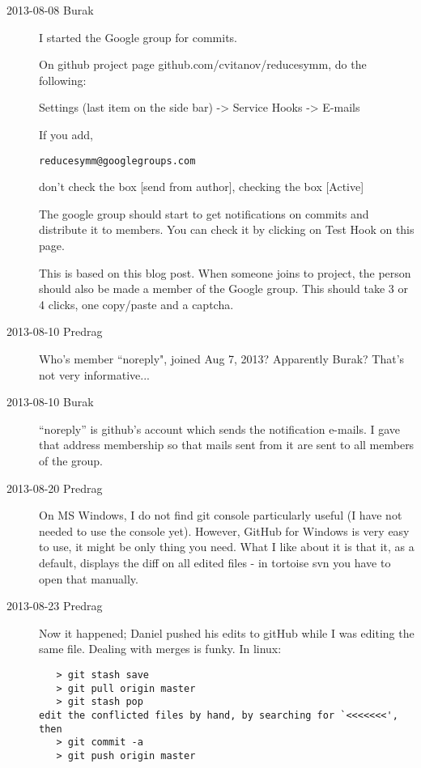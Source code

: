 \begin{description}
\item[2013-08-08 Burak]
I started the
 {Google group} for  commits.

On github project page
{github.com/cvitanov/reducesymm}, do the following:

Settings (last item on the side bar) -> Service Hooks -> E-mails

If you add,

\texttt{reducesymm@googlegroups.com}

don't check the box [send from author], checking the box [Active]

The google group should start to get notifications on commits and
distribute it to members.  You can check it by clicking on Test Hook on
this page.

This is based on
{this blog post}.
When someone joins
to project, the person should also be made a member of the
 {Google group}.
This should take 3 or 4 clicks, one copy/paste and a captcha.

\item[2013-08-10 Predrag]
Who's member ``noreply", joined Aug 7, 2013? Apparently Burak? That's not very informative...

\item[2013-08-10 Burak]
``noreply'' is github's account which sends the notification e-mails. I gave that address membership so that mails sent from it are sent
to all members of the group.

\item[2013-08-20 Predrag] On MS Windows, I do not find
 {git console} particularly useful (I have
not needed to use the console yet). However,
 {GitHub for Windows} is very easy
to use, it might be only thing you need. What I like about it is that
it, as a default, displays the diff on all edited files - in tortoise
svn you have to open that manually.

\item[2013-08-23 Predrag] Now it happened; Daniel pushed his edits to gitHub
while I was editing the same file. Dealing with merges is funky. In linux:
\begin{verbatim}
   > git stash save
   > git pull origin master
   > git stash pop
edit the conflicted files by hand, by searching for `<<<<<<<', then
   > git commit -a
   > git push origin master
\end{verbatim}



\end{description}
